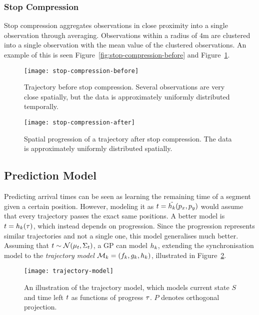 \subsubsection{Stop Compression}
\label{sec:stop-compression}
Stop compression aggregates observations in close proximity into a
single observation through averaging. Observations within a radius of
$4$m are clustered into a single observation with the mean value of
the clustered observations. An example of this is seen
Figure~\ref{fig:stop-compression-before} and Figure~\ref{fig:stop-compression-after}.
\begin{figure}
  \begin{minipage}{.46\textwidth}
    \texttt{[image: stop-compression-before]}
    \caption{Trajectory before stop compression. Several observations
      are very close spatially, but the data is
      approximately uniformly distributed temporally. }\label{fig:stop-compression-before}
  \end{minipage}
  \hspace{5pt}
  \begin{minipage}{.46\textwidth}
    \texttt{[image: stop-compression-after]}
    \caption{Spatial progression of a trajectory
      after stop compression. The data is
      approximately uniformly distributed spatially.}\label{fig:stop-compression-after}
  \end{minipage}
\end{figure}

\subsection{Prediction Model}
Predicting arrival times can be seen as learning the remaining time of
a segment given a certain position. However, modeling it as $t
= \tilde{h_{k}}(p_x, p_y)$ would assume that every trajectory passes the
exact same positions. A better model is $t
= h_{k}(\tau)$, which instead depends on progression. Since the
progression represents similar trajectories and not a single one, this
model generalises much better. Assuming that $t \sim
\mathcal{N}(\mu_{t}, \Sigma_{t})$, a GP can model $h_{k}$, 
extending the synchronisation model to the \textit{trajectory model}
$\mathcal{M}_{k} = (f_{k}, g_{k}, h_{k})$, illustrated in Figure~\ref{fig:trajectory-model}.
\begin{figure}
  \centering
  \texttt{[image: trajectory-model]}
  \caption{An illustration of the trajectory model, which models
    current state $S$ and time left $t$ as functions of
    progress $\tau$. $P$ denotes orthogonal projection.}\label{fig:trajectory-model}
\end{figure}

